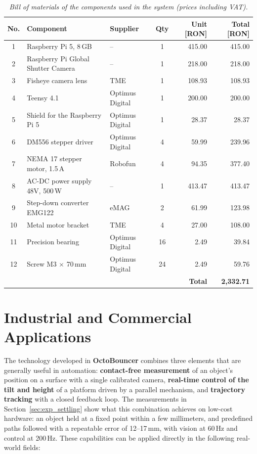 \documentclass[12pt,a4paper]{report}
\begin{document}
\begin{table}[H]
\centering
\begin{tabularx}{\textwidth}{|c|>{\raggedright\arraybackslash}X|l|c|r|r|}
\hline
\textbf{No.} & \textbf{Component} & \textbf{Supplier} & \textbf{Qty} & \textbf{Unit [RON]} & \textbf{Total [RON]} \\ \hline
1 & Raspberry Pi 5, 8\,GB & -- & 1 & 415.00 & 415.00 \\ \hline
2 & Raspberry Pi Global Shutter Camera & -- & 1 & 218.00 & 218.00 \\ \hline
3 & Fisheye camera lens & TME & 1 & 108.93 & 108.93 \\ \hline
4 & Teensy 4.1 & Optimus Digital & 1 & 200.00 & 200.00 \\ \hline
5 & Shield for the Raspberry Pi 5 & Optimus Digital & 1 & 28.37 & 28.37 \\ \hline
6 & DM556 stepper driver & Optimus Digital & 4 & 59.99 & 239.96 \\ \hline
7 & NEMA 17 stepper motor, 1.5\,A & Robofun & 4 & 94.35 & 377.40 \\ \hline
8 & AC-DC power supply 48V, 500\,W & -- & 1 & 413.47 & 413.47 \\ \hline
9 & Step-down converter EMG122 & eMAG & 2 & 61.99 & 123.98 \\ \hline
10 & Metal motor bracket & TME & 4 & 27.00 & 108.00 \\ \hline
11 & Precision bearing & Optimus Digital & 16 & 2.49 & 39.84 \\ \hline
12 & Screw M3 $\times$ 70\,mm & Optimus Digital & 24 & 2.49 & 59.76 \\ \hline
\multicolumn{5}{|r|}{\textbf{Total}} & \textbf{2,332.71} \\ \hline
\end{tabularx}
\caption{\textit{Bill of materials of the components used in the system (prices including VAT).}}
\label{tab:bom}
\end{table}

\section{Industrial and Commercial Applications}
\label{sec:applications}

The technology developed in \textbf{OctoBouncer} combines three elements that are generally useful in automation: \textbf{contact-free measurement} of an object's position on a surface with a single calibrated camera, \textbf{real-time control of the tilt and height} of a platform driven by a parallel mechanism, and \textbf{trajectory tracking} with a closed feedback loop. The measurements in Section~\ref{sec:exp_settling} show what this combination achieves on low-cost hardware: an object held at a fixed point within a few millimeters, and predefined paths followed with a repeatable error of 12--17\,mm, with vision at 60\,Hz and control at 200\,Hz. These capabilities can be applied directly in the following real-world fields:
\end{document}
